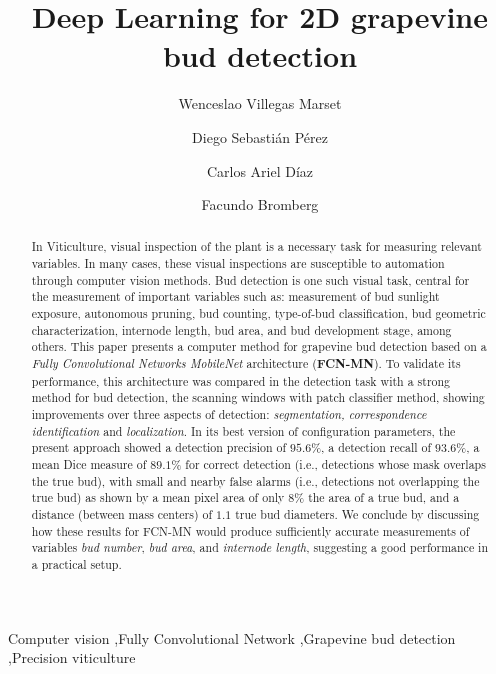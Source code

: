 \documentclass[a4paper,authoryear,review]{elsarticle}
\begin{document}
\begin{frontmatter}

\title{Deep Learning for 2D grapevine bud detection}

\author[utn]{Wenceslao Villegas Marset}

\author[utn,conicet]{Diego Sebastián Pérez}

\author[utn]{Carlos Ariel Díaz}

\author[utn,conicet]{Facundo Bromberg}

\address[utn]{Universidad Tecnológica Nacional.  Dpto. de Sistemas de la Información.  Grupo de Inteligencia Artificial DHARMa, Mendoza, Argentina.}

\address[conicet]{Consejo Nacional de Investigaciones Científicas y Técnicas (CONICET), Argentina.}


\begin{abstract}
In Viticulture, visual inspection of the plant is a necessary task for measuring relevant variables. In many cases, these visual inspections are susceptible to automation through computer vision methods. Bud detection is one such visual task, central for the measurement of important variables such as: measurement of bud sunlight exposure, autonomous pruning, bud counting, type-of-bud classification, bud geometric characterization, internode length, bud area, and bud development stage, among others. This paper presents a computer method for grapevine bud detection based on a \emph{Fully Convolutional Networks MobileNet} architecture (\textbf{FCN-MN}). To validate its performance, this architecture was compared in the detection task with a strong  method for bud detection, the scanning windows with patch classifier method, showing improvements over three aspects of detection: \emph{segmentation, correspondence identification} and \emph{localization}. In its best version of configuration parameters, the present approach showed a detection precision of $95.6\%$, a detection recall of $93.6\%$, a mean Dice measure of $89.1\%$ for correct detection (i.e., detections whose mask overlaps the true bud), with small and nearby false alarms (i.e., detections not overlapping the true bud) as shown by a mean pixel area of only $8\%$ the area of a true bud,  and a distance (between mass centers) of $1.1$ true bud diameters. We conclude by discussing how these results for FCN-MN would produce sufficiently accurate measurements of variables \emph{bud number}, \emph{bud area}, and \emph{internode length}, suggesting a good performance in a practical setup.
\end{abstract}

\begin{keyword}
Computer vision \sep Fully Convolutional Network \sep Grapevine bud detection \sep Precision viticulture
\end{keyword}
\end{frontmatter}
\end{document}
